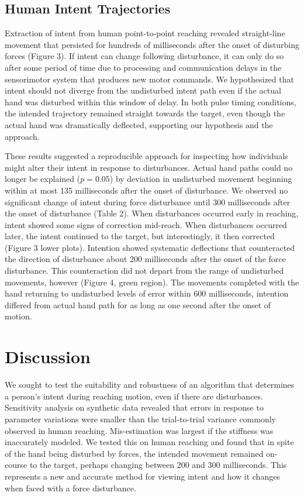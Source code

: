 \subsection*{Human Intent Trajectories}
Extraction of intent from human point-to-point reaching revealed straight-line movement that persisted for hundreds of milliseconds after the onset of disturbing forces (Figure 3). If intent can change following disturbance, it can only do so after some period of time due to processing and communication delays in the sensorimotor system that produces new motor commands. We hypothesized that intent should not diverge from the undisturbed intent path even if the actual hand was disturbed within this window of delay. In both pulse timing conditions, the intended trajectory remained straight towards the target, even though the actual hand was dramatically deflected, supporting our hypothesis and the approach. 

These results suggested a reproducible approach for inspecting how individuals might alter their intent in response to disturbances. Actual hand paths could no longer be explained ($p=0.05$) by deviation in undisturbed movement beginning within at most 135 milliseconds after the onset of disturbance. We observed no significant change of intent during force disturbance until 300 milliseconds after the onset of disturbance (Table 2). When disturbances occurred early in reaching, intent showed some signs of correction mid-reach. When disturbances occurred later, the intent continued to the target, but interestingly, it then corrected (Figure 3 lower plots). Intention showed systematic deflections that counteracted the direction of disturbance about 200 milliseconds after the onset of the force disturbance. This counteraction did not depart from the range of undisturbed movements, however (Figure 4, green region). The movements completed with the hand returning to undisturbed levels of error within 600 milliseconds, intention differed from actual hand path for as long as one second after the onset of motion.  
\section*{Discussion}
We sought to test the suitability and robustness of an algorithm that determines a person's intent during reaching motion, even if there are disturbances. Sensitivity analysis on synthetic data revealed that errors in response to parameter variations were smaller than the trial-to-trial variance commonly observed in human reaching. Mis-estimation was largest if the stiffness was inaccurately modeled. We tested this on human reaching and found that in spite of the hand being disturbed by forces, the intended movement remained on-course to the target, perhaps changing between 200 and 300 milliseconds. This represents a new and accurate method for viewing intent and how it changes when faced with a force disturbance.

